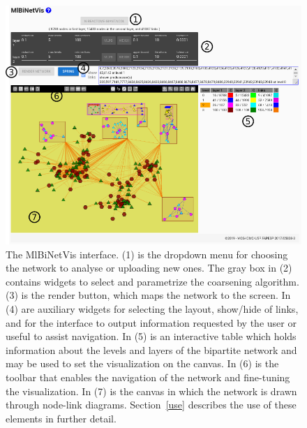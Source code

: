 \documentclass[runningheads]{llncs}
\begin{document}
\begin{figure}[!h]\centering
 \includegraphics[width=\textwidth]{overall____}
  \caption{The MlBiNetVis interface. (1) is the dropdown menu for choosing the network to analyse or uploading new ones.
  The gray box in (2) contains widgets to select and parametrize the coarsening algorithm.
  (3) is the render button, which maps the network to the screen.
  In (4) are auxiliary widgets for selecting the  layout, show/hide of links, and for the interface to output information requested by the user or useful to assist navigation.
  In (5) is an interactive table which holds information about the levels and layers of the bipartite network and may be used to set the visualization on the canvas.
  In (6) is the toolbar that enables the navigation of the network and fine-tuning the visualization.
  In (7) is the canvas in which the network is drawn through node-link diagrams.
  Section~\ref{use} describes the use of these elements in further detail.
  }\label{fpage0}
\end{figure}
\end{document}
